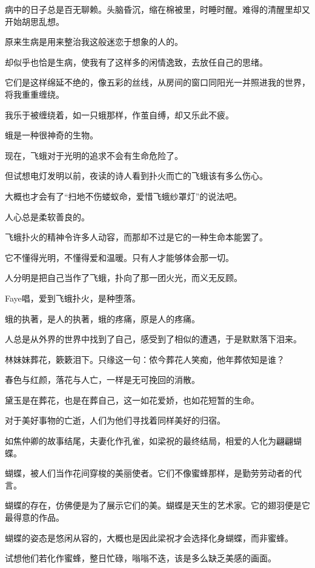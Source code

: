 \documentclass[12pt,a4paper]{article}
\begin{document}
	\endwriting



		病中的日子总是百无聊赖。头脑昏沉，缩在棉被里，时睡时醒。难得的清醒里却又开始胡思乱想。\par
		原来生病是用来整治我这般迷恋于想象的人的。\par
		却似乎也恰是生病，使我有了这样多的闲情逸致，去放任自己的思绪。

		它们是这样绵延不绝的，像五彩的丝线，从房间的窗口同阳光一并照进我的世界，将我重重缠绕。

		我乐于被缠绕着，如一只蛾那样，作茧自缚，却又乐此不疲。

		蛾是一种很神奇的生物。\par
		现在，飞蛾对于光明的追求不会有生命危险了。\par
		但试想电灯发明以前，夜读的诗人看到扑火而亡的飞蛾该有多么伤心。\par
		大概也才会有了“扫地不伤蝼蚁命，爱惜飞蛾纱罩灯”的说法吧。

		人心总是柔软善良的。

		飞蛾扑火的精神令许多人动容，而那却不过是它的一种生命本能罢了。\par
		它不懂得光明，不懂得爱和温暖。只有人才能够体会那一切。\par
		人分明是把自己当作了飞蛾，扑向了那一团火光，而义无反顾。\par
		Faye唱，爱到飞蛾扑火，是种堕落。\par
		蛾的执著，是人的执著，蛾的疼痛，原是人的疼痛。\par
		人总是从外界的世界中找到了自己，感受到了相似的遭遇，于是默默落下泪来。

		林妹妹葬花，簌簌泪下。只缘这一句：侬今葬花人笑痴，他年葬侬知是谁？\par
		春色与红颜，落花与人亡，一样是无可挽回的消散。\par
		黛玉是在葬花，也是在葬自己，这一如花爱娇，也如花短暂的生命。

		对于美好事物的亡逝，人们为他们寻找着同样美好的归宿。\par
		如焦仲卿的故事结尾，夫妻化作孔雀，如梁祝的最终结局，相爱的人化为翩翩蝴蝶。\par
		蝴蝶，被人们当作花间穿梭的美丽使者。它们不像蜜蜂那样，是勤劳劳动者的代言。\par
		蝴蝶的存在，仿佛便是为了展示它们的美。蝴蝶是天生的艺术家。它的翅羽便是它最得意的作品。\par
		蝴蝶的姿态是悠闲从容的，大概也是因此梁祝才会选择化身蝴蝶，而非蜜蜂。\par
		试想他们若化作蜜蜂，整日忙碌，嗡嗡不迭，该是多么缺乏美感的画面。
\end{document}
